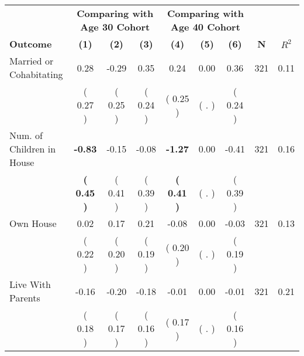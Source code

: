 \begin{tabular}{lcccccccc}
\toprule
 & \multicolumn{3}{c}{\textbf{Comparing with Age 30 Cohort}} & \multicolumn{3}{c}{\textbf{Comparing with Age 40 Cohort}} & \\
\cmidrule(lr){2-4} \cmidrule(lr){5-7} 
 \textbf{Outcome} & \textbf{(1)} & \textbf{(2)} & \textbf{(3)} & \textbf{(4)} & \textbf{(5)} & \textbf{(6)} & \textbf{N} & \textbf{$ R^2$} \\
\midrule
Married or Cohabitating &      0.28 &     -0.29 &      0.35 &      0.24 &      0.00 &      0.36 & 321 &       0.11 \\ 
 & (     0.27 ) & (     0.25 ) & (     0.24 ) & (     0.25 ) & (        . ) & (     0.24 ) & \\
Num. of Children in House & \textbf{    -0.83} &     -0.15 &     -0.08 & \textbf{    -1.27} &      0.00 &     -0.41 & 321 &       0.16 \\ 
 & \textbf{(     0.45 )} & (     0.41 ) & (     0.39 ) & \textbf{(     0.41 )} & (        . ) & (     0.39 ) & \\
Own House &      0.02 &      0.17 &      0.21 &     -0.08 &      0.00 &     -0.03 & 321 &       0.13 \\ 
 & (     0.22 ) & (     0.20 ) & (     0.19 ) & (     0.20 ) & (        . ) & (     0.19 ) & \\
Live With Parents &     -0.16 &     -0.20 &     -0.18 &     -0.01 &      0.00 &     -0.01 & 321 &       0.21 \\ 
 & (     0.18 ) & (     0.17 ) & (     0.16 ) & (     0.17 ) & (        . ) & (     0.16 ) & \\
\bottomrule
\end{tabular}
